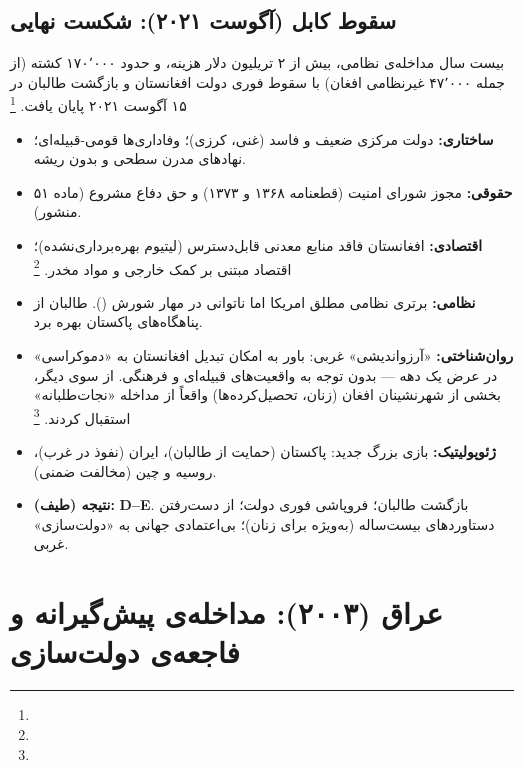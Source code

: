 \subsection{سقوط کابل (آگوست ۲۰۲۱): شکست نهایی}

بیست سال مداخله‌ی نظامی، بیش از ۲ تریلیون دلار هزینه، و حدود ۱۷۰٬۰۰۰ کشته (از جمله ۴۷٬۰۰۰ غیرنظامی افغان) با سقوط فوری دولت افغانستان و بازگشت طالبان در ۱۵ آگوست ۲۰۲۱ پایان یافت.%
\footnote{}

\begin{tcolorbox}[casebox, title={تحلیل شش‌وجهی: افغانستان (۲۰۰۱–۲۰۲۱)}]
\begin{itemize}[nosep, rightmargin=1em]
  \item \textbf{ساختاری:} دولت مرکزی ضعیف و فاسد (غنی، کرزی)؛ وفاداری‌ها قومی-قبیله‌ای؛ نهادهای مدرن سطحی و بدون ریشه.
  \item \textbf{حقوقی:} مجوز شورای امنیت (قطعنامه ۱۳۶۸ و ۱۳۷۳) و حق دفاع مشروع (ماده ۵۱ منشور).
  \item \textbf{اقتصادی:} افغانستان فاقد منابع معدنی قابل‌دسترس (لیتیوم بهره‌برداری‌نشده)؛ اقتصاد مبتنی بر کمک خارجی و مواد مخدر.%
  \footnote{}
  \item \textbf{نظامی:} برتری نظامی مطلق امریکا اما ناتوانی در مهار شورش (). طالبان از پناهگاه‌های پاکستان بهره برد.
  \item \textbf{روان‌شناختی:} «آرزواندیشی» غربی: باور به امکان تبدیل افغانستان به «دموکراسی» در عرض یک دهه — بدون توجه به واقعیت‌های قبیله‌ای و فرهنگی. از سوی دیگر، بخشی از شهرنشینان افغان (زنان، تحصیل‌کرده‌ها) واقعاً از مداخله «نجات‌طلبانه» استقبال کردند.%
  \footnote{}
  \item \textbf{ژئوپولیتیک:} بازی بزرگ جدید: پاکستان (حمایت از طالبان)، ایران (نفوذ در غرب)، روسیه و چین (مخالفت ضمنی).
  \item \textbf{نتیجه (طیف):} \textbf{D–E}. بازگشت طالبان؛ فروپاشی فوری دولت؛ از دست‌رفتن دستاوردهای بیست‌ساله (به‌ویژه برای زنان)؛ بی‌اعتمادی جهانی به «دولت‌سازی» غربی.
\end{itemize}
\end{tcolorbox}

\section{عراق (۲۰۰۳): مداخله‌ی پیش‌گیرانه و فاجعه‌ی دولت‌سازی}
\label{sec:ch10-iraq}

